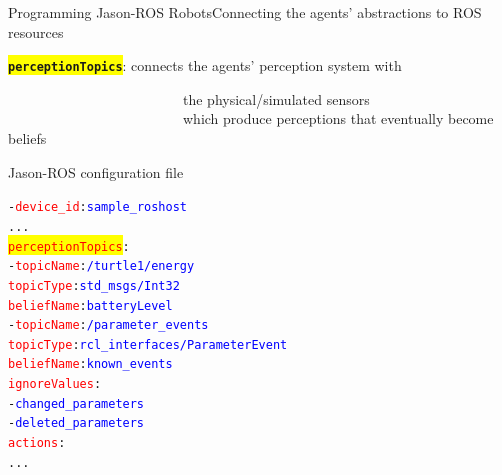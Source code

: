 \documentclass[compress]{beamer}
\newcommand{\yamlkey}[1]{\textcolor{red}{\texttt{#1}}}
\newcommand{\yamlvalue}[1]{\textcolor{blue}{\texttt{#1}}}
\begin{document}
\begin{frame}[fragile]{Programming Jason-ROS Robots}{Connecting the agents' abstractions to ROS resources}

\footnotesize
\colorbox{yellow}{\texttt{{\bf perceptionTopics}}}: %
connects the agents' perception system with\\ 

\vspace{-.47cm}

\ \ \ \ \ \ \ \ \ \ \ \ \ \ \ \ \ \ \ \ \ \ \ \ \ the physical/simulated sensors\\

\vspace{-.5cm}
\ \ \ \ \ \ \ \ \ \ \ \ \ \ \ \ \ \ \ \ \ \ \ \ \ {\tiny which produce perceptions that eventually become beliefs}


\begin{block}{{\scriptsize Jason-ROS configuration file}}


    
\begin{alltt}  \tiny
- \yamlkey{device\_id}: \yamlvalue{sample_roshost}         
     ...
  \colorbox{yellow}{\yamlkey{perceptionTopics}}:         
      - \yamlkey{topicName}: \yamlvalue{/turtle1/energy}
        \yamlkey{topicType}: \yamlvalue{std\_msgs/Int32}
        \yamlkey{beliefName}: \yamlvalue{batteryLevel} 
      - \yamlkey{topicName}: \yamlvalue{/parameter\_events}
        \yamlkey{topicType}: \yamlvalue{rcl\_interfaces/ParameterEvent}
        \yamlkey{beliefName}: \yamlvalue{known\_events}
        \yamlkey{ignoreValues}:
           - \yamlvalue{changed\_parameters}
           - \yamlvalue{deleted\_parameters}
  \yamlkey{actions}:       
     ...    
\end{alltt}
\end{block}            
\end{frame}
\end{document}
